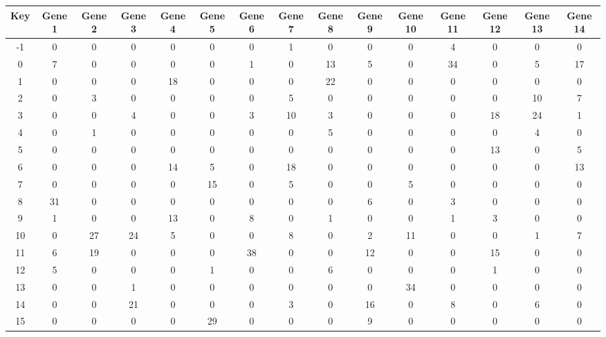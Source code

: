 \begin{tabular}{|c|c|c|c|c|c|c|c|c|c|c|c|c|c|c|}
\hline
Key & Gene 1 & Gene 2 & Gene 3 & Gene 4 & Gene 5 & Gene 6 & Gene 7 & Gene 8 & Gene 9 & Gene 10 & Gene 11 & Gene 12 & Gene 13 & Gene 14 \\
\hline
-1 & 0 & 0 & 0 & 0 & 0 & 0 & 1 & 0 & 0 & 0 & 4 & 0 & 0 & 0 \\
0 & 7 & 0 & 0 & 0 & 0 & 1 & 0 & 13 & 5 & 0 & 34 & 0 & 5 & 17 \\
1 & 0 & 0 & 0 & 18 & 0 & 0 & 0 & 22 & 0 & 0 & 0 & 0 & 0 & 0 \\
2 & 0 & 3 & 0 & 0 & 0 & 0 & 5 & 0 & 0 & 0 & 0 & 0 & 10 & 7 \\
3 & 0 & 0 & 4 & 0 & 0 & 3 & 10 & 3 & 0 & 0 & 0 & 18 & 24 & 1 \\
4 & 0 & 1 & 0 & 0 & 0 & 0 & 0 & 5 & 0 & 0 & 0 & 0 & 4 & 0 \\
5 & 0 & 0 & 0 & 0 & 0 & 0 & 0 & 0 & 0 & 0 & 0 & 13 & 0 & 5 \\
6 & 0 & 0 & 0 & 14 & 5 & 0 & 18 & 0 & 0 & 0 & 0 & 0 & 0 & 13 \\
7 & 0 & 0 & 0 & 0 & 15 & 0 & 5 & 0 & 0 & 5 & 0 & 0 & 0 & 0 \\
8 & 31 & 0 & 0 & 0 & 0 & 0 & 0 & 0 & 6 & 0 & 3 & 0 & 0 & 0 \\
9 & 1 & 0 & 0 & 13 & 0 & 8 & 0 & 1 & 0 & 0 & 1 & 3 & 0 & 0 \\
10 & 0 & 27 & 24 & 5 & 0 & 0 & 8 & 0 & 2 & 11 & 0 & 0 & 1 & 7 \\
11 & 6 & 19 & 0 & 0 & 0 & 38 & 0 & 0 & 12 & 0 & 0 & 15 & 0 & 0 \\
12 & 5 & 0 & 0 & 0 & 1 & 0 & 0 & 6 & 0 & 0 & 0 & 1 & 0 & 0 \\
13 & 0 & 0 & 1 & 0 & 0 & 0 & 0 & 0 & 0 & 34 & 0 & 0 & 0 & 0 \\
14 & 0 & 0 & 21 & 0 & 0 & 0 & 3 & 0 & 16 & 0 & 8 & 0 & 6 & 0 \\
15 & 0 & 0 & 0 & 0 & 29 & 0 & 0 & 0 & 9 & 0 & 0 & 0 & 0 & 0 \\
\hline
\end{tabular}
